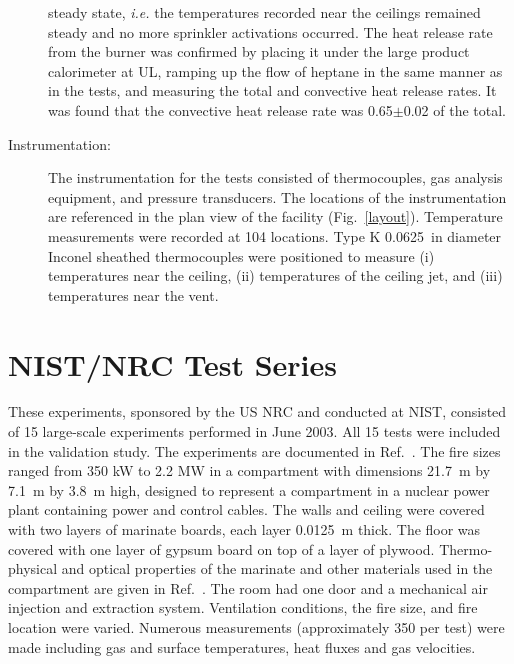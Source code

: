 \begin{description}
steady state, {\em i.e.} the temperatures recorded near the ceilings remained steady and no more sprinkler activations occurred.
The heat release rate from the burner was confirmed by placing it under the large product calorimeter at UL, ramping up the flow of heptane in the
same manner as in the tests, and measuring the total and convective heat release rates. It was found that the convective heat release rate was
0.65$\pm$0.02 of the total.
\item[Instrumentation:] The instrumentation for the tests consisted of thermocouples, gas analysis equipment, and pressure transducers. The locations of the instrumentation
are referenced in the plan view of the facility (Fig.~\ref{layout}).
Temperature measurements were recorded at 104 locations. Type K 0.0625~in diameter Inconel sheathed thermocouples were positioned to measure (i)
temperatures near the ceiling, (ii) temperatures of the ceiling jet, and (iii) temperatures near the vent.
\end{description}



\section{NIST/NRC Test Series}

These experiments, sponsored by the US NRC and conducted at NIST, consisted of 15 large-scale experiments performed in June 2003. All 15 tests were
included in the validation study. The experiments are documented in Ref.~\cite{Hamins:SP1013-1}. The fire sizes ranged from 350 kW to 2.2 MW in a compartment with dimensions
21.7~m by 7.1~m by 3.8~m high, designed to represent a compartment in a nuclear power plant containing power and control cables.
The walls and ceiling were covered with two layers of marinate boards, each layer 0.0125~m thick. The floor
was covered with one layer of gypsum board on top of a layer of plywood. Thermo-physical and optical properties of the marinate
and other materials used in the compartment are given in Ref.~\cite{Hamins:SP1013-1}. The room had one door and a mechanical air injection and extraction
system. Ventilation conditions, the fire size, and fire location were varied. Numerous measurements (approximately 350 per test) were made including
gas and surface temperatures, heat fluxes and gas velocities.

